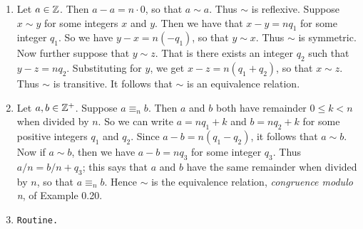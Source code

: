 \begin{enumerate}
      \begin{enumerate}
         \item Let $a \in \mathbb{Z}$. Then $a - a = n \cdot 0$, so that $a \sim a$.
               Thus $\sim$ is reflexive. Suppose $x \sim y$ for some integers
               $x$ and $y$. Then we have that $x - y = nq_1$ for some integer
               $q_1$. So we have $y - x = n(-q_1)$, so that $y \sim x$. Thus
               $\sim$ is symmetric. Now further suppose that $y \sim z$. That
               is there exists an integer $q_2$ such that $y - z = nq_2$. 
               Substituting for $y$, we get $x - z = n(q_1 + q_2)$, so that
               $x \sim z$. Thus $\sim$ is transitive. It follows that $\sim$ is
               an equivalence relation.
         \item Let $a, b \in \mathbb{Z}^+$. Suppose $a \equiv_n b$. Then $a$ and $b$ 
               both have remainder $0 \le k < n$ when divided by $n$. So we can 
               write $a = nq_1 + k$ and $b = nq_2 + k$ for some positive 
               integers $q_1$ and $q_2$. Since $a - b = n(q_1 - q_2)$, it 
               follows that $a \sim b$. Now if $a \sim b$, then we have
               $a - b = nq_3$ for some integer $q_3$. Thus $a/n = b/n + q_3$;
               this says that $a$ and $b$ have the same remainder when divided
               by $n$, so that $a \equiv_n b$. Hence $\sim$ is the equivalence
               relation, \textit{congruence modulo n}, of Example 0.20.
         \item \verb|Routine.|
      \end{enumerate}
\end{enumerate}
